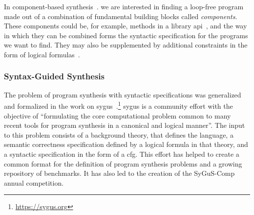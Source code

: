 In component-based
synthesis~\cite{Shi:2019:FCS,Feng:2018:PSU,Feng:2017:CST,Feng:2017:CSC,Jha:oracle:2010}.
we are interested in finding a loop-free program made out of a combination of
fundamental building blocks called \textit{components}. These components could
be, for example, methods in a library
\gls{api}~\cite{Shi:2019:FCS,Feng:2017:CSC}, and the way in which they can be
combined forms the syntactic specification for the programs we want to find.
They may also be supplemented by additional constraints in the form of logical
formulas~\cite{Feng:2018:PSU}.

\subsubsection{Syntax-Guided Synthesis}
\label{sec:sygus}

The problem of program synthesis with syntactic specifications was generalized
and formalized in the work on
\gls{sygus}~\cite{Alur:sygus:2013}.\footnote{\url{https://sygus.org}}
\gls{sygus} is a community effort with the objective of ``formulating the core
computational problem common to many recent tools for program synthesis in a
canonical and logical manner''.
The input to this problem consists of a background theory, that defines the
language, a semantic correctness specification defined by a logical formula in
that theory, and a syntactic specification in the form of a \gls{cfg}.
This effort has helped to create a common format for the definition of program
synthesis problems and a growing repository of benchmarks. It has also led to
the creation of the SyGuS-Comp annual competition.
